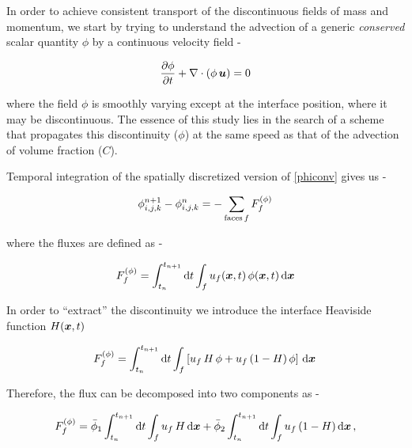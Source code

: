 In order to achieve consistent transport of the discontinuous fields 
of mass and momentum, we start by trying to understand the advection 
of a generic \textit{conserved} scalar quantity $\phi$ by a continuous velocity field - 


\begin{align}
	\frac{\partial \phi}{\partial t} + \nabla \cdot \left( \phi \, \boldsymbol{u} \right)  = 0 
\label{phiconv}
\end{align}


where the field $\phi$ is smoothly varying except 
at the interface position, where it may be discontinuous.
The essence of this study lies in the search of a scheme that  
propagates this discontinuity ($\phi$) at the same speed as 
that of the advection of volume fraction ($C$).


Temporal integration of the spatially discretized version of \eqref{phiconv} gives us - 

\begin{align}
\phi_{i,j,k}^{n+1} - \phi_{i,j,k}^{n} = - \sum_{\textrm{faces}\, f} F^{(\phi)}_f 
\label{sumfp}
\end{align}



where the fluxes are defined as -

\begin{align}
	F_f^{(\phi)} = \int_{t_n}^{t_{n+1}} {\textrm {d}}t \int_{f} u_f(\boldsymbol{x},t) \,\phi(\boldsymbol{x},t) \,
	{\textrm {d}}\boldsymbol{x}
\label{pfaceint}
\end{align}

In order to ``extract'' the discontinuity we introduce the 
 interface Heaviside function $ H(\boldsymbol{x},t) $

\begin{align}
F_f^{(\phi)} = 
\int_{t_n}^{t_{n+1}} {\textrm d}t \int_{f} \left[ u_f  \,H \,\phi  +  u_f \,(1-H) \,\phi \right] 
\, {\textrm d}\boldsymbol{x} \, 
\label{fluxphi}
\end{align}

Therefore, the flux can be decomposed into two components as -

\begin{align}
F_f^{(\phi)} = 
\bar \phi_1 \int_{t_n}^{t_{n+1}} {\textrm d}t \int_{f} u_f \,H \,{\textrm d}\boldsymbol{x} + 
\bar \phi_2 \int_{t_n}^{t_{n+1}} {\textrm d}t \int_{f} u_f \,(1-H) \,{\textrm d}\boldsymbol{x} \,,
\label{barphi}
\end{align}

